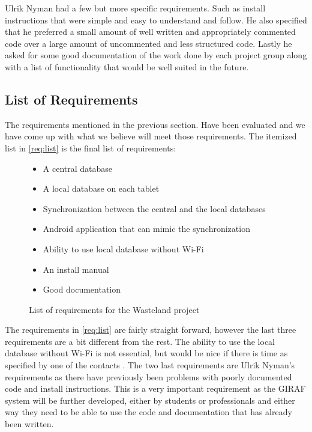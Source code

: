 Ulrik Nyman had a few but more specific requirements. Such as install instructions that were simple and easy to understand and follow. He also specified that he preferred a small amount of well written and appropriately commented code over a large amount of uncommented and less structured code. Lastly he asked for some good documentation of the work done by each project group along with a list of functionality that would be well suited in the future. 




\subsection{List of Requirements} %
\label{sub:list_of_requirements}
The requirements mentioned in the previous section. Have been evaluated and we have come up with what we believe will meet those requirements. The itemized list in \autoref{req:list} is the final list of requirements:

\begin{figure}[htpb]
	\label{req:list}
	\begin{itemize}
		\item A central database
		\item A local database on each tablet		
		\item Synchronization between the central and the local databases
		\item Android application that can mimic the synchronization
		\item Ability to use local database without Wi-Fi
		\item An install manual
		\item Good documentation
	\end{itemize}
	\caption{List of requirements for the Wasteland project}
\end{figure}

The requirements in \autoref{req:list} are fairly straight forward, however the last three requirements are a bit different from the rest. The ability to use the local database without Wi-Fi is not essential, but would be nice if there is time as specified by one of the contacts . The two last requirements are Ulrik Nyman's requirements as there have previously been problems with poorly documented code and install instructions. This is a very important requirement as the GIRAF system will be further developed, either by students or professionals and either way they need to be able to use the code and documentation that has already been written.
